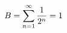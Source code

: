 \documentclass[preview]{standalone}
\begin{document}
\begin{align*}
\special{dvisvgm:raw <g id='unique000'>}B=\displaystyle\sum_{n=1}^{\infty}\dfrac{1}{2^n}=1\special{dvisvgm:raw </g>}
\end{align*}
\end{document}
